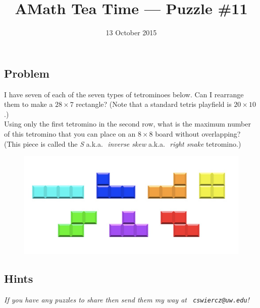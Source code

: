 \documentclass[12pt]{article}
\title{AMath Tea Time --- Puzzle \#11}
\author{}
\date{\vspace{-1cm}13 October 2015}
\begin{document}
\maketitle
{}

\subsection*{Problem}

 I have seven of each of the seven types of
tetrominoes below. Can I rearrange them to make a $28 \times 7$ rectangle?
(Note that a standard tetris playfield is $20 \times 10$.) \\

 Using only the first tetromino in the second row,
what is the maximum number of this tetromino that you can place on an $8 \times
8$ board without overlapping? (This piece is called the {\it S}
a.k.a. $\!\!\!\!$ {\it inverse skew} a.k.a. $\!\!\!\!$ {\it right snake}
tetromino.)

\begin{figure}[h]
  \centering
  \includegraphics[width=.75\textwidth]{tetromino.png}
\end{figure}

\subsection*{Hints}

{
\par\vspace*{\fill}
\noindent \small \it
If you have any puzzles to share then send them my way at {\tt
  cswiercz@uw.edu}!
}
\end{document}
